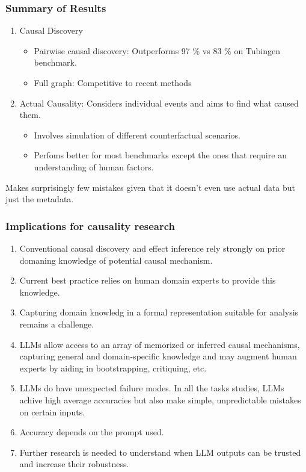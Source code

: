 \documentclass{beamer}
\begin{document}
\begin{frame}
	\frametitle{Summary of Results}
	\begin{enumerate}
		\item Causal Discovery
			\begin{itemize}
				\item Pairwise causal discovery: Outperforms 97 \% vs 83 \% on Tubingen benchmark.
				\item Full graph: Competitive to recent methods
			\end{itemize}
		\item Actual Causality: Considers individual events and aims to find
			what caused them.
			\begin{itemize}
				\item Involves simulation of different
					counterfactual scenarios.
				\item Perfoms better for most benchmarks except the ones
					that require an understanding of human factors.
			\end{itemize}
	\end{enumerate}
	Makes surprisingly few mistakes given that it doesn't even use actual data but just the metadata.
\end{frame}

\begin{frame}
	\frametitle{Implications for causality research}
	\begin{enumerate}
		\item Conventional causal discovery and effect inference rely strongly on prior domaning knowledge of potential causal mechanism. 
		\item Current best practice relies on human domain experts to provide this knowledge.
		\item Capturing domain knowledg in a formal representation suitable for analysis remains a challenge.
		\item LLMs allow access to an array of memorized or inferred causal mechanisms, capturing general and domain-specific knowledge and may augment human experts by aiding in bootstrapping, critiquing, etc.
		\item LLMs do have unexpected failure modes. In all the tasks studies, LLMs achive high average accuracies but also make simple, unpredictable mistakes on certain inputs.
		\item Accuracy depends on the prompt used.
		\item Further research is needed to understand when LLM outputs can be trusted and increase their robustness.
	\end{enumerate}
\end{frame}
\end{document}

